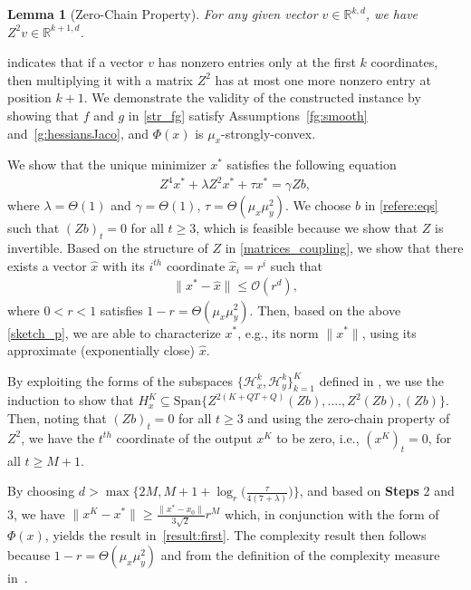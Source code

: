 \documentclass{osudissert96}
\newtheorem{lemma}{Lemma}
\begin{document}
\begin{lemma}[Zero-Chain Property]\label{zero_chain}
For any given vector $v\in\mathbb{R}^{k,d}$, we have $Z^2v\in\mathbb{R}^{k+1,d}$.
\end{lemma}
 indicates  that if a vector $v$ has nonzero entries only at the first $k$ coordinates, then multiplying it with a matrix $Z^2$ has at most one more nonzero entry at position $k+1$. We demonstrate the validity of the constructed instance by 
showing that  $f$ and $g$ in \cref{str_fg} satisfy Assumptions~\ref{fg:smooth} and~\ref{g:hessiansJaco}, and $\Phi(x)$ is $\mu_x$-strongly-convex.  

\vspace{0.1cm}
  We show that the unique minimizer $x^*$ satisfies the following equation   
 \begin{align}\label{refere:eqs}
 Z^4 x^* +\lambda Z^2x^* +\tau x^* = \gamma Zb,
\end{align}
where $\lambda=\Theta(1)$ and $\gamma=\Theta(1)$, $\tau = \Theta(\mu_x\mu_y^2)$. We  choose $b$ in \cref{refere:eqs} such that $(Zb)_t=0$  for all $t\geq 3$, which is feasible because we show that $Z$ is invertible. Based on the structure of $Z$ in \cref{matrices_coupling}, we show that there exists a vector $\hat x$ with its $i^{th}$ coordinate $\hat x_i = r^i$ such that 
\begin{align}\label{sketch_p}
\|x^*-\hat x\| \leq \mathcal{O}(r^d),
\end{align}
where $0<r<1$ satisfies  $1-r=\Theta(\mu_x\mu_y^2)$. Then, based on the above  \cref{sketch_p}, we are able to characterize $x^*$, e.g., its norm $\|x^*\|$, using its approximate (exponentially close) $\hat x$. 

\vspace{0.1cm}
   By exploiting the forms of  the subspaces {\small$\{\mathcal{H}_x^k,\mathcal{H}_y^k\}_{k=1}^K$}
defined in , we use the induction to show that 
{\small$H_{x}^{K }\subseteq \mbox{Span}\{Z^{2(K+QT+Q)}(Zb),....,Z^2(Zb),(Zb) \}$}.
 Then, noting that $(Zb)_t=0$  for all $t\geq 3$ and using the zero-chain property of $Z^2$, we have the $t^{th}$ coordinate of the output $x^K$ to be zero, i.e., $(x^K)_{t}=0$,  for all $t\geq M+1$.
 
 \vspace{0.1cm}
  By choosing $d> \max\big\{2M,M+1+\log_{r}\big(\frac{\tau}{4(7+\lambda)}\big)\big\}$, and based on {\bf Steps} 2 and 3, we have  
$ \|x^K-x^*\| \geq \frac{\|x^*-x_0\|}{3\sqrt{2}} r^M$
which, in conjunction with the form of $\Phi(x)$, yields the result in~\cref{result:first}. The complexity result then follows because $1-r=\Theta(\mu_x\mu_y^2)$ and from the definition of the complexity measure in~.
\end{document}
